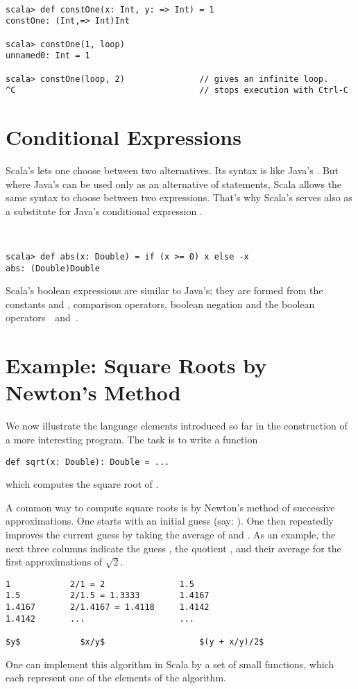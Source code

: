 \example\ 
 
\begin{lstlisting}
scala> def constOne(x: Int, y: => Int) = 1
constOne: (Int,=> Int)Int

scala> constOne(1, loop)
unnamed0: Int = 1

scala> constOne(loop, 2)               // gives an infinite loop.
^C                                     // stops execution with Ctrl-C
\end{lstlisting}

\section{Conditional Expressions}

Scala's  lets one choose between two alternatives.  Its
syntax is like Java's . But where Java's 
can be used only as an alternative of statements, Scala allows the
same syntax to choose between two expressions. That's why Scala's
 serves also as a substitute for Java's conditional
expression .

\example\ 

\begin{lstlisting}
scala> def abs(x: Double) = if (x >= 0) x else -x
abs: (Double)Double
\end{lstlisting}
Scala's boolean expressions are similar to Java's; they are formed
from the constants
 and
, comparison operators, boolean negation \code{!} and the
boolean operators $\,$\code{&&}$\,$ and $\,$\code{||}.

\section{\label{sec:sqrt}Example: Square Roots by Newton's Method}

We now illustrate the language elements introduced so far in the
construction of a more interesting program. The task is to write a
function
\begin{lstlisting}
def sqrt(x: Double): Double = ...
\end{lstlisting}
which computes the square root of .

A common way to compute square roots is by Newton's method of
successive approximations. One starts with an initial guess 
(say: ). One then repeatedly improves the current guess
 by taking the average of  and .  As an
example, the next three columns indicate the guess , the
quotient , and their average for the first approximations of
$\sqrt 2$.
\begin{lstlisting}
1            2/1 = 2               1.5
1.5          2/1.5 = 1.3333        1.4167
1.4167       2/1.4167 = 1.4118     1.4142
1.4142       ...                   ...

$y$            $x/y$                   $(y + x/y)/2$
\end{lstlisting}
One can implement this algorithm in Scala by a set of small functions,
which each represent one of the elements of the algorithm.  

